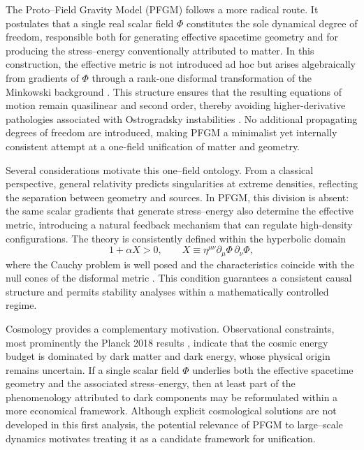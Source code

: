\documentclass{article}
\begin{document}
The Proto–Field Gravity Model (PFGM) follows a more radical route. It postulates that a single real scalar field $\Phi$ constitutes the sole dynamical degree of freedom, responsible both for generating effective spacetime geometry and for producing the stress–energy conventionally attributed to matter. In this construction, the effective metric is not introduced ad hoc but arises algebraically from gradients of $\Phi$ through a rank-one disformal transformation of the Minkowski background \cite{Bekenstein1993,Bettoni2013}. This structure ensures that the resulting equations of motion remain quasilinear and second order, thereby avoiding higher-derivative pathologies associated with Ostrogradsky instabilities \cite{Woodard2015}. No additional propagating degrees of freedom are introduced, making PFGM a minimalist yet internally consistent attempt at a one-field unification of matter and geometry.

Several considerations motivate this one–field ontology. From a classical perspective, general relativity predicts singularities at extreme densities, reflecting the separation between geometry and sources. In PFGM, this division is absent: the same scalar gradients that generate stress–energy also determine the effective metric, introducing a natural feedback mechanism that can regulate high-density configurations. The theory is consistently defined within the hyperbolic domain
\begin{equation}
1+\alpha X > 0, 
\qquad 
X \equiv \eta^{\mu\nu}\partial_\mu \Phi \,\partial_\nu \Phi ,\label{2}
\end{equation}
where the Cauchy problem is well posed and the characteristics coincide with the null cones of the disformal metric \cite{Bekenstein1993,Bettoni2013}. This condition guarantees a consistent causal structure and permits stability analyses within a mathematically controlled regime.

Cosmology provides a complementary motivation. Observational constraints, most prominently the Planck 2018 results \cite{Planck2018_Cosmology}, indicate that the cosmic energy budget is dominated by dark matter and dark energy, whose physical origin remains uncertain. If a single scalar field $\Phi$ underlies both the effective spacetime geometry and the associated stress–energy, then at least part of the phenomenology attributed to dark components may be reformulated within a more economical framework. Although explicit cosmological solutions are not developed in this first analysis, the potential relevance of PFGM to large–scale dynamics motivates treating it as a candidate framework for unification.
\end{document}
